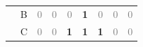 \documentclass[11pt]{report}
\begin{document}
\begin{table}[htbp]
\begin{tabular}{c c c c c c c c c }
                          & B & \textcolor{gray}{0}         & \textcolor{gray}{0}         & \textcolor{gray}{0}         & \textbf{1}         & \textcolor{gray}{0}         & \textcolor{gray}{0}         & \textcolor{gray}{0}         \\
                          & C & \textcolor{gray}{0}         & \textcolor{gray}{0}         & \textbf{1}         & \textbf{1}         & \textbf{1}         & \textcolor{gray}{0}         & \textcolor{gray}{0}         \\
        \hline
    \end{tabular}
\end{table}





\end{document}
